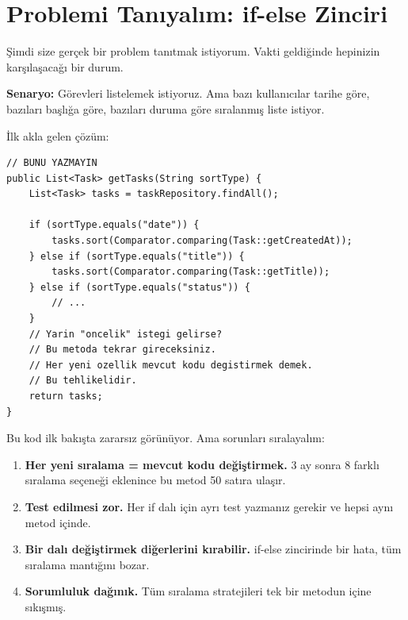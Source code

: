 \documentclass[11pt,a4paper]{article}
\begin{document}
\newpage

\section{Problemi Tan{\i}yal{\i}m: if-else Zinciri}

\c{S}imdi size ger\c{c}ek bir problem tan{\i}tmak istiyorum. Vakti geldi\u{g}inde hepinizin kar\c{s}{\i}la\c{s}aca\u{g}{\i} bir durum.

\textbf{Senaryo:} G\"{o}revleri listelemek istiyoruz. Ama baz{\i} kullan{\i}c{\i}lar tarihe g\"{o}re, baz{\i}lar{\i} ba\c{s}l{\i}\u{g}a g\"{o}re, baz{\i}lar{\i} duruma g\"{o}re s{\i}ralanm{\i}\c{s} liste istiyor.

\.{I}lk akla gelen \c{c}\"{o}z\"{u}m:

\begin{lstlisting}[style=java]
// BUNU YAZMAYIN
public List<Task> getTasks(String sortType) {
    List<Task> tasks = taskRepository.findAll();

    if (sortType.equals("date")) {
        tasks.sort(Comparator.comparing(Task::getCreatedAt));
    } else if (sortType.equals("title")) {
        tasks.sort(Comparator.comparing(Task::getTitle));
    } else if (sortType.equals("status")) {
        // ...
    }
    // Yarin "oncelik" istegi gelirse?
    // Bu metoda tekrar gireceksiniz.
    // Her yeni ozellik mevcut kodu degistirmek demek.
    // Bu tehlikelidir.
    return tasks;
}
\end{lstlisting}

Bu kod ilk bak{\i}\c{s}ta zarars{\i}z g\"{o}r\"{u}n\"{u}yor. Ama sorunlar{\i} s{\i}ralayal{\i}m:

\begin{enumerate}
    \item \textbf{Her yeni s{\i}ralama = mevcut kodu de\u{g}i\c{s}tirmek.} 3 ay sonra 8 farkl{\i} s{\i}ralama se\c{c}ene\u{g}i eklenince bu metod 50 sat{\i}ra ula\c{s}{\i}r.
    \item \textbf{Test edilmesi zor.} Her if dal{\i} i\c{c}in ayr{\i} test yazman{\i}z gerekir ve hepsi ayn{\i} metod i\c{c}inde.
    \item \textbf{Bir dal{\i} de\u{g}i\c{s}tirmek di\u{g}erlerini k{\i}rabilir.} if-else zincirinde bir hata, t\"{u}m s{\i}ralama mant{\i}\u{g}{\i}n{\i} bozar.
    \item \textbf{Sorumluluk da\u{g}{\i}n{\i}k.} T\"{u}m s{\i}ralama stratejileri tek bir metodun i\c{c}ine s{\i}k{\i}\c{s}m{\i}\c{s}.
\end{enumerate}
\end{document}
